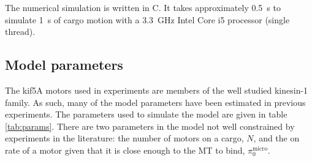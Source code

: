 The numerical simulation is written in C. It takes approximately \SI{.5}{\second} to simulate \SI{1}{\second} of cargo motion with a \SI{3.3}{\giga\hertz} Intel Core i5 processor (single thread).

\subsection{Model parameters}

The kif5A motors used in experiments are members of the well studied kinesin-1 family. As such,  many of the model parameters have been estimated in previous experiments. The parameters used to simulate the model are given in table \ref{tab:params}. There are two parameters in the model not well constrained by experiments in the literature: the number of motors on a cargo, $N$, and the on rate of a motor given that it is close enough to the MT to bind, $\pi_0^{\text{micro}}$.

